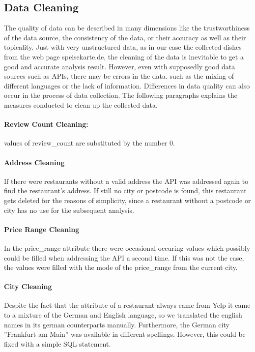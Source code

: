 \subsection{Data Cleaning}
\label{subsec:cleaning}
The quality of data can be described in many dimensions like \eg{} the trustworthiness of the data source, the consistency of the data,
or their accuracy as well as their topicality\cite{QD15}.
Just with very unstructured data, as in our case the collected dishes from the web page speisekarte.de, the cleaning of the data is
inevitable to get a good and accurate analysis result.
However, even with supposedly good data sources such as \acp{API}, there may be errors in the data.
such as \eg{} the mixing of different languages or the lack of information.
Differences in data quality can also occur in the process of data collection.
\newline
The following paragraphs explains the measures conducted to clean up the collected data.
\paragraph{Review Count Cleaning:}  values of review\_count are substituted by the number 0.
\paragraph{Address Cleaning}
If there were restaurants without a valid address the \ylp{} \ac{API} was addressed again to find the restaurant's address.
If still no city or postcode is found, this restaurant gets deleted for the reasons of simplicity, since a restaurant without a postcode or city has no use for the subsequent analysis.
\paragraph{Price Range Cleaning}
In the price\_range attribute there were occasional occuring  values which possibly could be filled when addressing the \ylp{} \ac{API} a second time.
If this was not the case, the  values were filled with the mode of the price\_range from the current city.
\paragraph{City Cleaning}
Despite the fact that the  attribute of a restaurant always came from Yelp it came to a mixture of the German and English language,
so we translated the english names in its german counterparts manually.
Furthermore, the German city ''Frankfurt am Main'' was available in different spellings.
However, this could be fixed with a simple \ac{SQL} statement.
